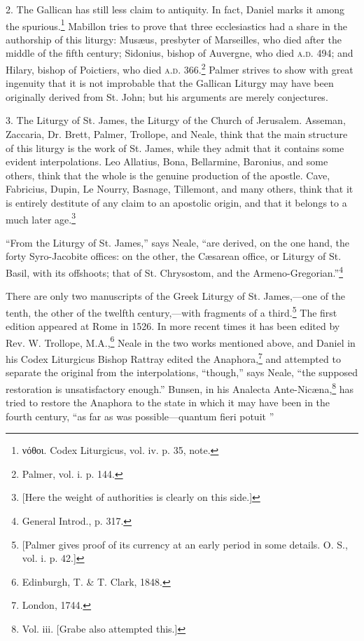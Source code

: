 2. The Gallican has still less claim to antiquity. In fact, Daniel marks it among the spurious.\footnote{\par  \textgreek{νόθοι}. Codex Liturgicus, vol. iv. p. 35, note.} Mabillon tries to prove that three ecclesiastics had a share in the authorship of this liturgy: Musæus, presbyter of Marseilles, who died after the middle of the fifth century; Sidonius, bishop of Auvergne, who died \textsc{a.d.} 494; and Hilary, bishop of Poictiers, who died \textsc{a.d.} 366.\footnote{\par  Palmer, vol. i. p. 144.} Palmer strives to show with great ingenuity that it is not improbable that the Gallican Liturgy may have been originally derived from St. John; but his arguments are merely conjectures.

3. The Liturgy of St. James, the Liturgy of the Church of Jerusalem. Asseman, Zaccaria, Dr. Brett, Palmer, Trollope, and Neale, think that the main structure of this liturgy is the work of St. James, while they admit that it contains some evident interpolations. Leo Allatius, Bona, Bellarmine, Baronius, and some others, think that the whole is the genuine production of the apostle. Cave, Fabricius, Dupin, Le Nourry, Basnage, Tillemont, and many others, think that it is entirely destitute of any claim to an apostolic origin, and that it belongs to a much later age.\footnote{\par{}  [Here the weight of authorities is clearly on this side.]}

“From the Liturgy of St. James,” says Neale, “are derived, on the one hand, the forty Syro-Jacobite offices: on the other, the Cæsarean office, or Liturgy of St. Basil, with its offshoots; that of St. Chrysostom, and the Armeno-Gregorian.”\footnote{\par  General Introd., p. 317.}

There are only two manuscripts of the Greek Liturgy of St. James,—one of the tenth, the other of the twelfth century,—with fragments of a third.\footnote{\par{}  [Palmer gives proof of its currency at an early period in some details. O. S., vol. i. p. 42.]} The first edition appeared at Rome in 1526. In more recent times it has been edited by Rev. W. Trollope, M.A.,\footnote{\par  Edinburgh, T. \& T. Clark, 1848.} Neale in the two works mentioned above, and Daniel in his Codex Liturgicus Bishop Rattray edited the Anaphora,\footnote{\par  London, 1744.} and attempted to separate the original from the interpolations, “though,” says Neale, “the supposed restoration is unsatisfactory enough.” Bunsen, in his Analecta Ante-Nicæna,\footnote{\par  Vol. iii. [Grabe also attempted this.]} has tried to restore the Anaphora to the state in which it may have been in the fourth century, “as far as was possible—quantum fieri potuit ”

